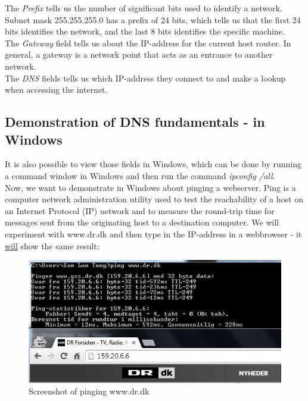The \textit{Prefix} tells us the number of significant bits used to identify a network. Subnet mask 255.255.255.0 has a prefix of 24 bits, which tells us that the first 24 bits identifies the network, and the last 8 bits identifies the specific machine. \\

The \textit{Gateway} field tells us about the IP-address for the current host router. In general, a gateway is a network point that acts as an entrance to another network. \\

The \textit{DNS} fields tells us which IP-address they connect to and make a lookup when accessing the internet.

\subsection{Demonstration of DNS fundamentals - in Windows}

It is also possible to view those fields in Windows, which can be done by running a command window in Windows and then run the command \textit{ipconfig /all}. \\

Now, we want to demonstrate in Windows about pinging a webserver. Ping is a computer network administration utility used to test the reachability of a host on an Internet Protocol (IP) network and to measure the round-trip time for messages sent from the originating host to a destination computer.
We will experiment with www.dr.dk and then type in the IP-address in a webbrowser - it \underline{will} show the same result:

\begin{figure}[ht!]
\centering
\includegraphics[width=150mm]{img/ping.png}
\caption{Screenshot of pinging www.dr.dk}
\label{ping}
\end{figure}

